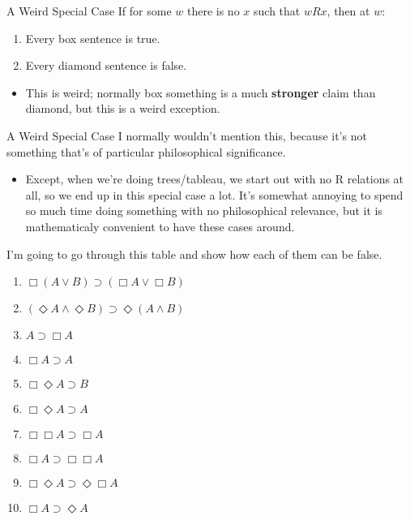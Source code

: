 \documentclass[
  14pt,
  letterpaper,
  ignorenonframetext,
  aspectratio=169,
]{beamer}
\providecommand{\tightlist}{%
  \setlength{\itemsep}{0pt}\setlength{\parskip}{0pt}}\usepackage{longtable,booktabs,array}
\begin{document}
\begin{frame}{A Weird Special Case}
\protect\hypertarget{a-weird-special-case}{}
If for some \(w\) there is no \(x\) such that \(wRx\), then at \(w\):

\begin{enumerate}[<+->]
\tightlist
\item
  Every box sentence is true.
\item
  Every diamond sentence is false.
\end{enumerate}

\begin{itemize}[<+->]
\tightlist
\item
  This is weird; normally box something is a much \textbf{stronger}
  claim than diamond, but this is a weird exception.
\end{itemize}
\end{frame}

\begin{frame}{A Weird Special Case}
\protect\hypertarget{a-weird-special-case-1}{}
I normally wouldn't mention this, because it's not something that's of
particular philosophical significance.

\begin{itemize}[<+->]
\tightlist
\item
  Except, when we're doing trees/tableau, we start out with no R
  relations at all, so we end up in this special case a lot. It's
  somewhat annoying to spend so much time doing something with no
  philosophical relevance, but it is mathematicaly convenient to have
  these cases around.
\end{itemize}
\end{frame}

\begin{frame}
I'm going to go through this table and show how each of them can be
false.

\begin{enumerate}[<+->]
\tightlist
\item
  \(\Box(A \vee B) \supset (\Box A \vee \Box B)\)
\item
  \((\Diamond A \wedge \Diamond B) \supset \Diamond (A \wedge B)\)
\item
  \(A \supset \Box A\)
\item
  \(\Box A \supset A\)
\item
  \(\Box \Diamond A \supset B\)
\item
  \(\Box \Diamond A \supset A\)
\item
  \(\Box \Box A \supset \Box A\)
\item
  \(\Box A \supset \Box \Box A\)
\item
  \(\Box \Diamond A \supset \Diamond \Box A\)
\item
  \(\Box A \supset \Diamond A\)
\end{enumerate}
\end{frame}
\end{document}
